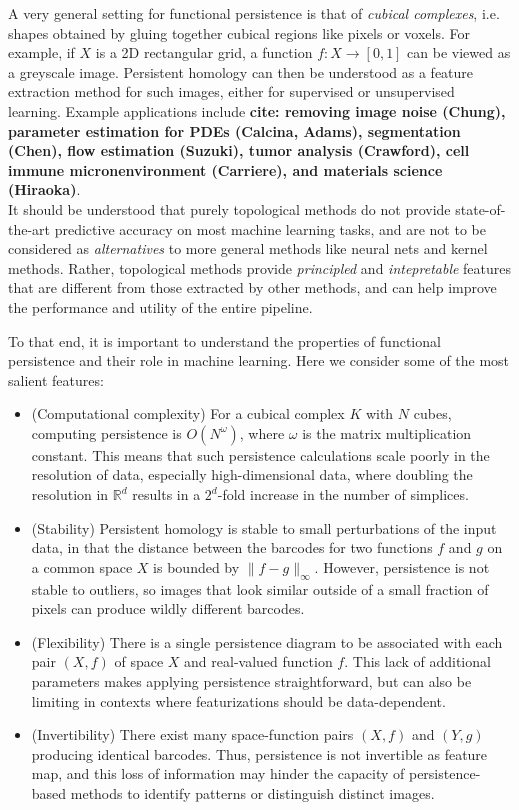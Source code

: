 \documentclass[conference]{IEEEtran}
\theoremstyle{definition}
\numberwithin{figure}{section}
\begin{document}
A very general setting for functional persistence is that of \emph{cubical complexes}, i.e. shapes obtained by gluing together cubical regions like pixels or voxels. For example, if $X$ is a 2D rectangular grid, a function $f:X \to [0,1]$ can be viewed as a greyscale image. Persistent homology can then be understood as a feature extraction method for such images, either for supervised or unsupervised learning. Example applications include {\bf cite: removing image noise (Chung), parameter estimation for PDEs (Calcina, Adams), segmentation (Chen), flow estimation (Suzuki), tumor analysis (Crawford), cell immune micronenvironment (Carriere), and materials science (Hiraoka)}.\\

It should be understood that purely topological methods do not provide state-of-the-art predictive accuracy on most machine learning tasks, and are not to be considered as \emph{alternatives} to more general methods like neural nets and kernel methods. Rather, topological methods provide \emph{principled} and \emph{intepretable} features that are different from those extracted by other methods, and can help improve the performance and utility of the entire pipeline.

To that end, it is important to understand the properties of functional persistence and their role in machine learning. Here we consider some of the most salient features:
\begin{itemize}
	\item (Computational complexity) For a cubical complex $K$ with $N$ cubes, computing persistence is $O(N^\omega)$, where $\omega$ is the matrix multiplication constant. This means that such persistence calculations scale poorly in the resolution of data, especially high-dimensional data, where doubling the resolution in $\mathbb{R}^d$ results in a $2^{d}$-fold increase in the number of simplices.
	\item (Stability) Persistent homology is stable to small perturbations of the input data, in that the distance between the barcodes for two functions $f$ and $g$ on a common space $X$ is bounded by $\|f-g\|_{\infty}$. However, persistence is not stable to outliers, so images that look similar outside of a small fraction of pixels can produce wildly different barcodes.
	\item (Flexibility) There is a single persistence diagram to be associated with each pair $(X,f)$ of space $X$ and real-valued function $f$. This lack of additional parameters makes applying persistence straightforward, but can also be limiting in contexts where featurizations should be data-dependent. 
	\item (Invertibility) There exist many space-function pairs $(X,f)$ and $(Y,g)$ producing identical barcodes. Thus, persistence is not invertible as feature map, and this loss of information may hinder the capacity of persistence-based methods to identify patterns or distinguish distinct images.
\end{itemize}
\end{document}
